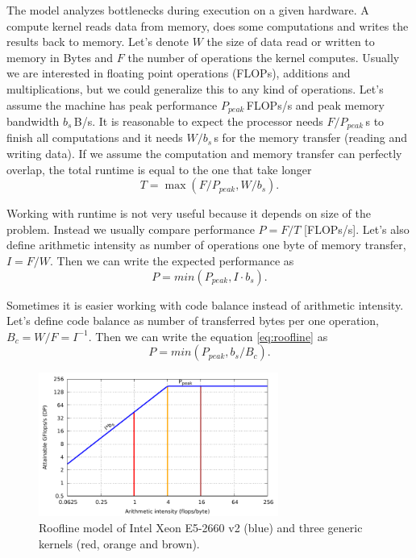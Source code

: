The model analyzes bottlenecks during execution on a given hardware.
A compute kernel reads data from memory, does some computations and writes the results back to memory. Let's denote $W$ the size of data read or written to memory in Bytes and $F$ the number of operations the kernel computes. Usually we are interested in floating point operations (FLOPs), additions and multiplications, but we could generalize this to any kind of operations.
Let's assume the machine has peak performance $P_{peak}$\,FLOPs/s and peak memory bandwidth $b_s$\,B/s.
It is reasonable to expect the processor needs $F/P_{peak}$\,s to finish all computations and it needs $W/b_s$\,s for the memory transfer (reading and writing data). If we assume the computation and memory transfer can perfectly overlap, the total runtime is equal to the one that take longer
\begin{equation}
    T = \max(F/P_{peak}, W/b_s).
\end{equation}

Working with runtime is not very useful because it depends on size of the problem. Instead we usually compare performance $P=F/T$ [FLOPs/s].
Let's also define arithmetic intensity as number of operations one byte of memory transfer, $I=F/W$. Then we can write the expected performance as
\begin{equation}
   P = min(P_{peak}, I \cdot b_s). \label{eq:roofline}
\end{equation}

Sometimes it is easier working with code balance instead of arithmetic intensity. Let's define code balance as number of transferred bytes per one operation, $B_c=W/F=I^{-1}$. Then we can write the equation \ref{eq:roofline} as
\begin{equation}
   P = min(P_{peak}, b_s/B_c). \label{eq:roofline_balance}
\end{equation}

\begin{figure}[ht]
   \centering
   \includegraphics[width=0.7\textwidth,clip=true]{images/roofline/roofline_emmy_Xeon2660v2_naive.pdf}
   \caption{Roofline model of Intel Xeon E5-2660 v2 (blue) and three generic kernels (red, orange and brown).}
  \label{fig:roofline_emmy_naive}
\end{figure}

